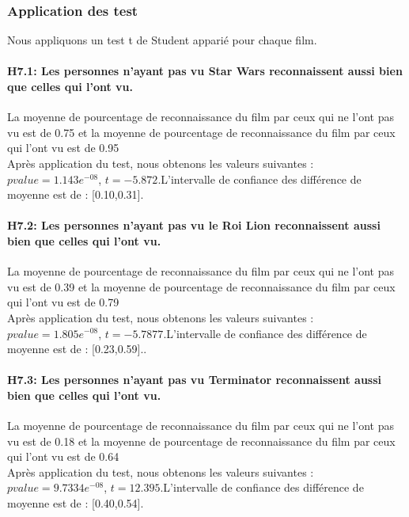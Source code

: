 \documentclass{article} %
\begin{document}
\subsubsection{ Application des test}
Nous appliquons un test t de Student apparié pour chaque film.
\paragraph{H7.1: Les personnes n’ayant pas vu Star Wars reconnaissent aussi bien que celles qui l’ont vu.\\}
La moyenne de pourcentage de reconnaissance du film par ceux qui ne l'ont pas vu est de 0.75 et la moyenne de pourcentage de reconnaissance du film par ceux qui l'ont vu est de 0.95\\
Après application du test, nous obtenons les valeurs suivantes : $pvalue =  1.143e^{-08}$, $t = -5.872$.L'intervalle de confiance des différence de moyenne est de : [0.10,0.31].

\paragraph{H7.2: Les personnes n’ayant pas vu le Roi Lion reconnaissent aussi bien que celles qui l’ont vu. \\}
La moyenne de pourcentage de reconnaissance du film par ceux qui ne l'ont pas vu est de 0.39 et la moyenne de pourcentage de reconnaissance du film par ceux qui l'ont vu est de 0.79\\
Après application du test, nous obtenons les valeurs suivantes : $pvalue =  1.805e^{-08}$, $t = -5.7877$.L'intervalle de confiance des différence de moyenne est de : [0.23,0.59]..

\paragraph{H7.3: Les personnes n’ayant pas vu Terminator reconnaissent aussi bien que celles qui l’ont vu. }
La moyenne de pourcentage de reconnaissance du film par ceux qui ne l'ont pas vu est de 0.18 et la moyenne de pourcentage de reconnaissance du film par ceux qui l'ont vu est de 0.64\\
Après application du test, nous obtenons les valeurs suivantes : $pvalue = 9.7334e^{-08}$, $t = 12.395$.L'intervalle de confiance des différence de moyenne est de : [0.40,0.54].
\end{document}
